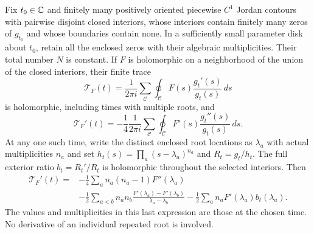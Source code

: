 \documentclass[11pt]{article}
\begin{document}
\begin{hdttheorem}
\label{hdt:thm:collision-trace}
Fix $t_0\in\mathbb C$ and finitely many positively oriented piecewise
$C^1$ Jordan contours with pairwise disjoint closed interiors,
whose interiors contain finitely many zeros of $g_{t_0}$ and
whose boundaries contain none. In a sufficiently
small parameter disk about $t_0$, retain all the enclosed zeros
with their algebraic multiplicities. Their total number $N$ is
constant. If $F$ is holomorphic on a neighborhood of the union
of the closed interiors, their finite trace
\begin{equation}\label{hdt:eq:contour-trace}
\mathscr T_F(t)=\frac1{2\pi i}\sum_{\mathcal C}
\oint_{\mathcal C}F(s)\frac{g_t'(s)}{g_t(s)}\,ds
\end{equation}
is holomorphic, including times with multiple roots, and
\begin{equation}\label{hdt:eq:contour-trace-derivative}
\mathscr T_F'(t)=-\frac14\frac1{2\pi i}
\sum_{\mathcal C}\oint_{\mathcal C}
F'(s)\frac{g_t''(s)}{g_t(s)}\,ds.
\end{equation}
At any one such time, write the distinct enclosed root locations
as $\lambda_a$ with actual multiplicities $n_a$ and set
$h_t(s)=\prod_a(s-\lambda_a)^{n_a}$ and $R_t=g_t/h_t$.
The full exterior ratio $b_t=R_t'/R_t$ is holomorphic throughout
the selected interiors. Then
\begin{equation}\label{hdt:eq:multiple-trace}
\begin{split}
\mathscr T_F'(t)={}&-\frac14\sum_a n_a(n_a-1)F''(\lambda_a)\\
&-\frac12\sum_{a<b}n_an_b
\frac{F'(\lambda_a)-F'(\lambda_b)}{\lambda_a-\lambda_b}
-\frac12\sum_a n_aF'(\lambda_a)b_t(\lambda_a).
\end{split}
\end{equation}
The values and multiplicities in this last expression are those
at the chosen time. No derivative of an individual repeated root
is involved.
\end{hdttheorem}
\end{document}
